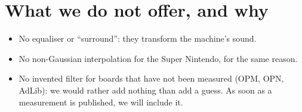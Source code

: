 \section{What we do not offer, and why}
\begin{itemize}
  \item No equaliser or ``surround'': they transform the machine's sound.
  \item No non-Gaussian interpolation for the Super Nintendo, for the same reason.
  \item No invented filter for boards that have not been measured (OPM, OPN, AdLib): we would rather add nothing than
        add a guess. As soon as a measurement is published, we will include it.
\end{itemize}
